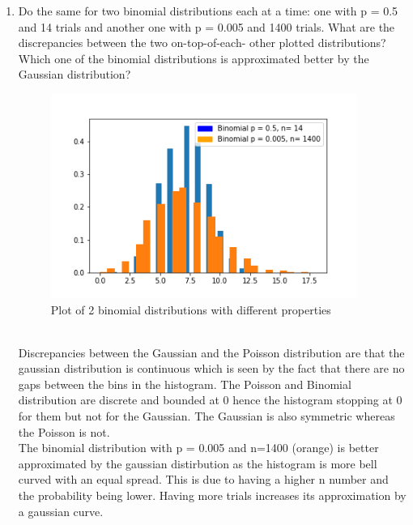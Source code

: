 \documentclass[12pt]{article}
\begin{document}
\begin{enumerate}
\begin{enumerate}
\begin{enumerate}
        \item Do the same for two binomial distributions each at a time: one with p = 0.5 and 14 trials and another one with p = 0.005 and 1400 trials. What are the discrepancies between the two on-top-of-each- other plotted distributions? Which one of the binomial distributions is approximated better by the Gaussian distribution?
    \begin{figure}[h] 
        \includegraphics[width=10cm]{BVsB.png}
        \centering 
        \caption{Plot of 2 binomial distributions with different properties}
    \end{figure}
    \\
    Discrepancies between the Gaussian and the Poisson distribution are that the gaussian distribution is continuous which is seen by the fact that there are no gaps between the bins in the histogram. The Poisson and Binomial distribution are discrete and bounded at 0 hence the histogram stopping at 0 for them but not for the Gaussian. The Gaussian is also symmetric whereas the Poisson is not.
    \\
    The binomial distribution with p = 0.005 and n=1400 (orange) is better approximated by the gaussian distirbution as the histogram is more bell curved with an equal spread. This is due to having a higher n number and the probability being lower. Having more trials increases its approximation by a gaussian curve.



\end{enumerate}
\end{enumerate}
\end{enumerate}
\end{document}
